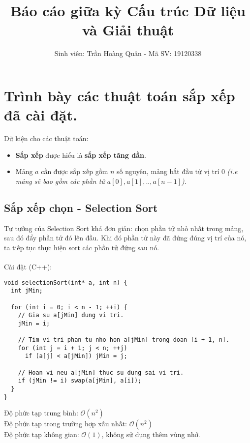 \documentclass[]{article}
\title{Báo cáo giữa kỳ Cấu trúc Dữ liệu và Giải thuật}
\author{Sinh viên: Trần Hoàng Quân - Mã SV: 19120338}
\begin{document}
\maketitle
\tableofcontents
\pagebreak

\section{Trình bày các thuật toán sắp xếp đã cài đặt.}
Dữ kiện cho các thuật toán:
\begin{itemize}
\item \textbf{Sắp xếp} được hiểu là \textbf{sắp xếp tăng dần}.
\item Mảng $a$ cần được sắp xếp gồm $n$ số nguyên, mảng bắt đầu từ vị trí 0 \textit{(i.e mảng sẽ bao gồm các phần tử $a[0], a[1], .., a[n - 1]$)}.
\end{itemize}
\subsection{Sắp xếp chọn - Selection Sort}
Tư tưởng của Selection Sort khá đơn giản: chọn phần tử nhỏ nhất trong mảng, sau đó đẩy phần tử đó lên đầu. Khi đó phần tử này đã đứng đúng vị trí của nó, ta tiếp tục thực hiện sort các phần tử đứng sau nó.
\\\\
Cài đặt (C++):
\begin{lstlisting}
void selectionSort(int* a, int n) {
  int jMin;

  for (int i = 0; i < n - 1; ++i) {
    // Gia su a[jMin] dung vi tri.
    jMin = i;

    // Tim vi tri phan tu nho hon a[jMin] trong doan [i + 1, n].
    for (int j = i + 1; j < n; ++j)
      if (a[j] < a[jMin]) jMin = j;

    // Hoan vi neu a[jMin] thuc su dung sai vi tri.
    if (jMin != i) swap(a[jMin], a[i]);
  }
}
\end{lstlisting}
Độ phức tạp trung bình: $\mathcal{O}(n^2)$
\\
Độ phức tạp trong trường hợp xấu nhất: $\mathcal{O}(n^2)$
\\
Độ phức tạp không gian: $\mathcal{O}(1)$, không sử dụng thêm vùng nhớ.
\end{document}
